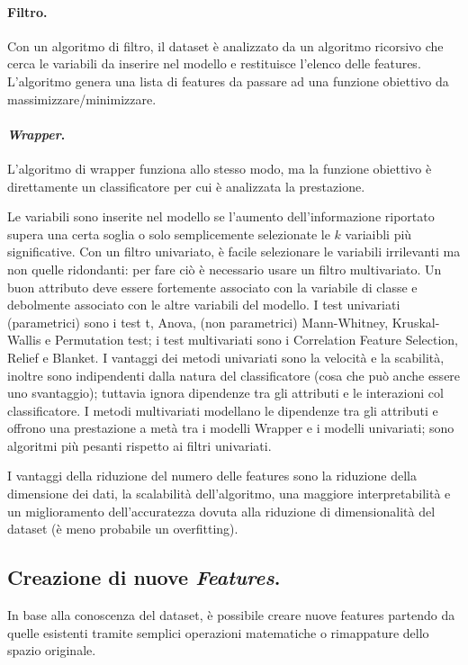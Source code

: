 \documentclass[11pt, a4page, twocolumn]{article}
\begin{document}
\paragraph{Filtro.}
Con un algoritmo di filtro, il dataset è analizzato da un algoritmo ricorsivo che cerca le variabili da inserire nel modello e restituisce l'elenco delle features.
L'algoritmo genera una lista di features da passare ad una funzione obiettivo da massimizzare/minimizzare.

\paragraph{\textit{Wrapper}.}
L'algoritmo di wrapper funziona allo stesso modo, ma la funzione obiettivo è direttamente un classificatore per cui è analizzata la prestazione. \newline

Le variabili sono inserite nel modello se l'aumento dell'informazione riportato supera una certa soglia o solo semplicemente selezionate le $k$ variaibli più significative.
Con un filtro univariato, è facile selezionare le variabili irrilevanti ma non quelle ridondanti: per fare ciò è necessario usare un filtro multivariato.
Un buon attributo deve essere fortemente associato con la variabile di classe e debolmente associato con le altre variabili del modello.
I test univariati (parametrici) sono i test t, Anova, (non parametrici) Mann-Whitney, Kruskal-Wallis e Permutation test; i test multivariati sono i Correlation Feature Selection, Relief e Blanket.
I vantaggi dei metodi univariati sono la velocità e la scabilità, inoltre sono indipendenti dalla natura del classificatore (cosa che può anche essere uno svantaggio); tuttavia ignora dipendenze tra gli attributi e le interazioni col classificatore. \newline
I metodi multivariati modellano le dipendenze tra gli attributi e offrono una prestazione a metà tra i modelli Wrapper e i modelli univariati; sono algoritmi più pesanti rispetto ai filtri univariati.

I vantaggi della riduzione del numero delle features sono la riduzione della dimensione dei dati, la scalabilità dell'algoritmo, una maggiore interpretabilità e un miglioramento dell'accuratezza dovuta alla riduzione di dimensionalità del dataset (è meno probabile un overfitting).

\subsection{Creazione di nuove \textit{Features}.}
In base alla conoscenza del dataset, è possibile creare nuove features partendo da quelle esistenti tramite semplici operazioni matematiche o rimappature dello spazio originale.
\end{document}
